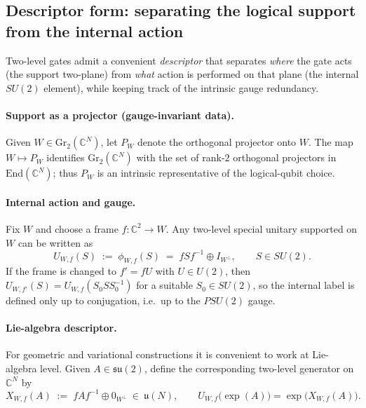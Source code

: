 \documentclass{article}%
\theoremstyle{definition}
\numberwithin{equation}{section}
\newcommand{\C}{\mathbb{C}}
\newcommand{\Gr}{\mathrm{Gr}}
\newcommand{\End}{\mathrm{End}}
\begin{document}
\subsection{Descriptor form: separating the logical support from the internal action}
\label{subsec:descriptor_form}

Two-level gates admit a convenient \emph{descriptor} that separates \emph{where} the gate acts (the
support two-plane) from \emph{what} action is performed on that plane (the internal $SU(2)$ element),
while keeping track of the intrinsic gauge redundancy.

\paragraph{Support as a projector (gauge-invariant data).}
Given $W\in\Gr_2(\C^N)$, let $P_W$ denote the orthogonal projector onto $W$. The map $W\mapsto P_W$
identifies $\Gr_2(\C^N)$ with the set of rank-$2$ orthogonal projectors in $\End(\C^N)$; thus $P_W$ is
an intrinsic representative of the logical-qubit choice.

\paragraph{Internal action and gauge.}
Fix $W$ and choose a frame $f:\C^2\to W$. Any two-level special unitary supported on $W$ can be
written as
\begin{equation}\label{eq:descriptor_group_level_SU2}
U_{W,f}(S)\;:=\;\phi_{W,f}(S)\;=\; fSf^{-1}\oplus I_{W^\perp},\qquad S\in SU(2).
\end{equation}
If the frame is changed to $f'=fU$ with $U\in U(2)$, then $U_{W,f'}(S)=U_{W,f}(S_0SS_0^{-1})$ for a
suitable $S_0\in SU(2)$, so the internal label is defined only up to conjugation, i.e.\ up to the
$PSU(2)$ gauge.

\paragraph{Lie-algebra descriptor.}
For geometric and variational constructions it is convenient to work at Lie-algebra level. Given
$A\in\mathfrak{su}(2)$, define the corresponding two-level generator on $\C^N$ by
\begin{equation}\label{eq:descriptor_lie_level_SU2}
X_{W,f}(A)\;:=\; fAf^{-1}\oplus 0_{W^\perp}\ \in\ \mathfrak{u}(N),
\qquad
U_{W,f}\big(\exp(A)\big)=\exp\!\big(X_{W,f}(A)\big).
\end{equation}
\end{document}
